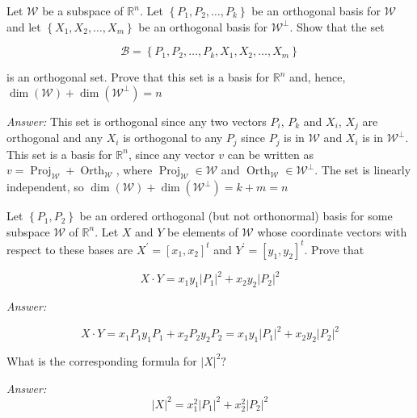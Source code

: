 \documentclass[letterpaper]{article}
\newcommand{\ans}{\textit{Answer: }}
\newenvironment{question}[2][Question]{\begin{trivlist}
\item[\hskip \labelsep {\bfseries #1}\hskip \labelsep {\bfseries #2.}]}{\end{trivlist}}
\begin{document}
\begin{question}{6.32}
  Let $\mathcal{W}$ be a subspace of $\mathbb{R}^{n} .$ Let $\left\{P_{1}, P_{2}, \ldots, P_{k}\right\}$ be an orthogonal basis for $\mathcal{W}$
and let $\left\{X_{1}, X_{2}, \ldots, X_{m}\right\}$ be an orthogonal basis for $\mathcal{W}^{\perp} .$ Show that the set

$$
\mathcal{B}=\left\{P_{1}, P_{2}, \ldots, P_{k}, X_{1}, X_{2}, \ldots, X_{m}\right\}
$$

is an orthogonal set. Prove that this set is a basis for $\mathbb{R}^{n}$ and, hence, $\operatorname{dim}(\mathcal{W})
+\operatorname{dim}\left(\mathcal{W}^{\perp}\right)=n$

  \ans This set is orthogonal since any two vectors $P_i$, $P_k$ and $X_i$, $X_j$
  are orthogonal and any $X_i$ is orthogonal to any $P_j$ since $P_j$ is in $\mathcal{W}$
  and $X_i$ is in $\mathcal{W}^{\perp}$. This set is a basis for $\mathbb{R}^{n}$, since
  any vector $v$ can be written as $v = \operatorname{Proj}_{\mathcal{W}} + 
  \operatorname{Orth}_{\mathcal{W}}$, where $\operatorname{Proj}_{\mathcal{W}} \in \mathcal{W}$
  and $\operatorname{Orth}_{\mathcal{W}} \in \mathcal{W}^{\perp}$. The set is 
  linearly independent, so $\operatorname{dim}(\mathcal{W})
  +\operatorname{dim}\left(\mathcal{W}^{\perp}\right) = k + m =n$
\end{question}

\begin{question}{6.37}
Let $\left\{P_{1}, P_{2}\right\}$ be an ordered orthogonal (but not orthonormal) basis for some
subspace $\mathcal{W}$ of $\mathbb{R}^{n} .$ Let $X$ and $Y$ be elements of $\mathcal{W}$ whose coordinate vectors
with respect to these bases are $X^{\prime}=\left[x_{1}, x_{2}\right]^{t}$ and $Y^{\prime}=\left[y_{1}, y_{2}\right]^{t} .$ Prove that
  
$$
X \cdot Y=x_{1} y_{1}\left|P_{1}\right|^{2}+x_{2} y_{2}\left|P_{2}\right|^{2}
$$

\ans 

$$
X \cdot Y=x_{1}P_{1}y_{1}P_{1}+x_{2}P_{2} y_{2}P_{2}
= x_{1} y_{1}\left|P_{1}\right|^{2}+x_{2} y_{2}\left|P_{2}\right|^{2}
$$

What is the corresponding formula for $|X|^{2} ?$

\ans 
$$|X|^{2} = x_{1}^2\left|P_{1}\right|^{2}+x_{2}^2 \left|P_{2}\right|^{2}$$

\end{question}
\end{document}
